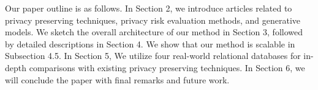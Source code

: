 Our paper outline is as follows. In Section 2, we introduce articles related to privacy preserving techniques, privacy risk evaluation methods, and generative models. We sketch the overall architecture of our method in Section 3, followed by detailed descriptions in Section 4. We  show that our method is scalable in Subsection 4.5. In Section 5, We utilize four real-world relational databases for in-depth comparisons with existing privacy preserving techniques. In Section 6, we will conclude the paper with final remarks and future work.